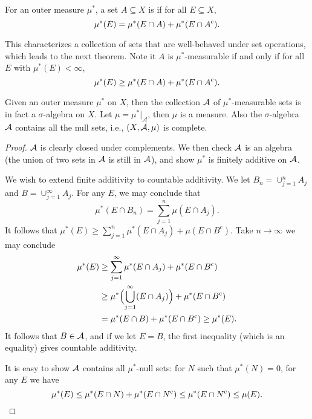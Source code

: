 \begin{defn}
    For an outer measure $\mu^{*}$, a set $A\subseteq X$ is  if for all $E\subseteq X$, \[
        \mu^{*}(E)=\mu^{*}(E\cap A)+\mu^{*}(E\cap A^{\mathrm{c}}).
    \] 
\end{defn}

    This characterizes a collection of sets that are well-behaved under set operations, which leads to the next theorem. Note it $A$ is $\mu^{*}$-measurable if and only if for all $E$ with $\mu^{*}(E)<\infty$, \[
        \mu^{*}(E)\geq\mu^{*}(E\cap A)+\mu^{*}(E\cap A^{\mathrm{c}}).\]
\begin{namedthm}
    Given an outer measure $\mu^{*}$ on $X$, then the collection $\mathcal{A}$ of $\mu^{*}$-measurable sets is in fact a $\sigma$-algebra on $X$. Let $\mu=\mu^{*}|_{\mathcal{A}}$, then $\mu$ is a measure. Also the $\sigma$-algebra $\mathcal{A}$ contains all the null sets, i.e., $(X,\mathcal{A},\mu)$ is complete.
\end{namedthm}

\begin{proof}
$\mathcal{A}$ is clearly closed under complements. We then check $\mathcal{A}$ is an algebra (the union of two sets in $\mathcal{A}$ is still in $\mathcal{A}$), and show $\mu^{*}$ is finitely additive on $\mathcal{A}$.

We wish to extend finite additivity to countable additivity. We let
$B_{n}=\cup_{j=1}^{n}A_{j}$ and $B=\cup_{j=1}^{\infty}A_{j}$. For
any $E$, we may conclude that 
\[
\mu^{*}(E\cap B_{n})=\sum_{j=1}^{n}\mu(E\cap A_{j}).
\]
It follows that $\mu^{*}(E)\geq\sum_{j=1}^{n}\mu^{*}(E\cap A_{j})+\mu(E\cap B^{\mathrm{c}}).$
Take $n\to\infty$ we may conclude 
\begin{align*}
\mu^{*}(E) & \geq\sum_{j=1}^{\infty}\mu^{*}(E\cap A_{j})+\mu^{*}(E\cap B^{\mathrm{c}})\\
 & \geq\mu^{*}\Bigl(\bigcup_{j=1}^{\infty}(E\cap A_{j})\Bigr)+\mu^{*}(E\cap B^{\mathrm{c}})\\
 & =\mu^{*}(E\cap B)+\mu^{*}(E\cap B^{\mathrm{c}})\geq\mu^{*}(E).
\end{align*}
It follows that $B\in\mathcal{A}$, and if we let $E=B$, the first inequality
(which is an equality) gives countable additivity.

It is easy to show $\mathcal{A}$ contains all $\mu^{*}$-null sets: for $N$
such that $\mu^{*}(N)=0$, for any $E$ we have 
\[
\mu^{*}(E)\leq\mu^{*}(E\cap N)+\mu^{*}(E\cap N^{\mathrm{c}})\leq\mu^{*}(E\cap N^{\mathrm{c}})\leq\mu(E).\qedhere
\]
\end{proof}

